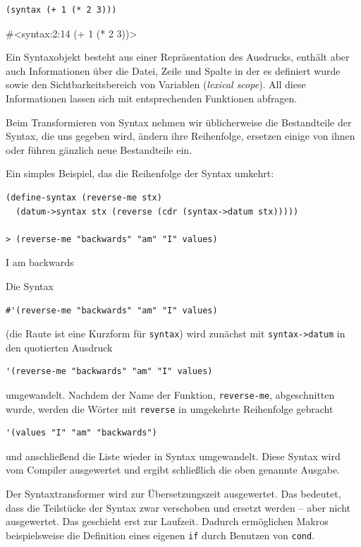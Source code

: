 \begin{lstlisting}
(syntax (+ 1 (* 2 3)))
\end{lstlisting}
{\routput\#<syntax:2:14 (+ 1 (* 2 3))>}

Ein Syntaxobjekt besteht aus einer Repräsentation des Ausdrucks, enthält aber auch Informationen über die Datei, Zeile und Spalte in der es definiert wurde sowie den Sichtbarkeitsbereich von Variablen (\emph{lexical scope}). All diese Informationen lassen sich mit entsprechenden Funktionen abfragen.

Beim Transformieren von Syntax nehmen wir üblicherweise die Bestandteile der Syntax, die uns gegeben wird, ändern ihre Reihenfolge, ersetzen einige von ihnen oder führen gänzlich neue Bestandteile ein.

Ein simples Beispiel, das die Reihenfolge der Syntax umkehrt:

\begin{lstlisting}
(define-syntax (reverse-me stx)
  (datum->syntax stx (reverse (cdr (syntax->datum stx)))))
  
> (reverse-me "backwards" "am" "I" values)
\end{lstlisting}
{\routput {\qq}I{\qq} {\qq}am{\qq} {\qq}backwards{\qq}}

Die Syntax

\begin{lstlisting}
#'(reverse-me "backwards" "am" "I" values)
\end{lstlisting}

(die Raute ist eine Kurzform für \texttt{syntax}) wird zunächst mit \texttt{syntax->datum} in den quotierten Ausdruck 

\begin{lstlisting}
'(reverse-me "backwards" "am" "I" values)
\end{lstlisting}


umgewandelt. Nachdem der Name der Funktion, \texttt{reverse-me}, abgeschnitten wurde, werden die Wörter mit \texttt{reverse} in umgekehrte Reihenfolge gebracht

\begin{lstlisting}
'(values "I" "am" "backwards")
\end{lstlisting}

und anschließend die Liste wieder in Syntax umgewandelt. Diese Syntax wird vom Compiler ausgewertet und ergibt schließlich die oben genannte Ausgabe.


Der Syntaxtransformer wird zur Übersetzungszeit ausgewertet. Das bedeutet, dass die Teilstücke der Syntax zwar verschoben und ersetzt werden -- aber nicht ausgewertet. Das geschieht erst zur Laufzeit. Dadurch ermöglichen Makros beispielsweise die Definition eines eigenen \texttt{if} durch Benutzen von \texttt{cond}.

